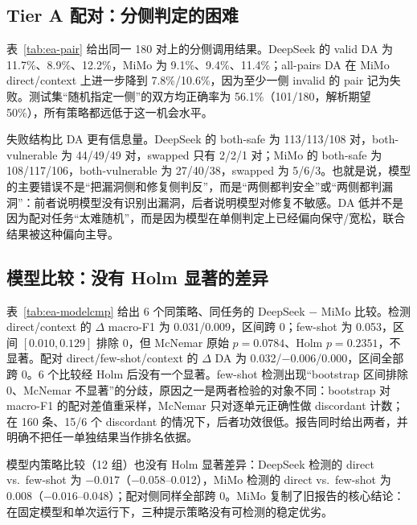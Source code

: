 \documentclass[conference]{IEEEtran}
\begin{document}
\subsection{Tier A 配对：分侧判定的困难}
表~\ref{tab:ea-pair} 给出同一 180 对上的分侧调用结果。DeepSeek 的 valid DA 为 11.7\%、8.9\%、12.2\%，MiMo 为 9.1\%、9.4\%、11.4\%；all-pairs DA 在 MiMo direct/context 上进一步降到 7.8\%/10.6\%，因为至少一侧 invalid 的 pair 记为失败。测试集“随机指定一侧”的双方均正确率为 56.1\%（101/180，解析期望 50\%），所有策略都远低于这一机会水平。

失败结构比 DA 更有信息量。DeepSeek 的 both-safe 为 113/113/108 对，both-vulnerable 为 44/49/49 对，swapped 只有 2/2/1 对；MiMo 的 both-safe 为 108/117/106，both-vulnerable 为 27/40/38，swapped 为 5/6/3。也就是说，模型的主要错误不是“把漏洞侧和修复侧判反”，而是“两侧都判安全”或“两侧都判漏洞”：前者说明模型没有识别出漏洞，后者说明模型对修复不敏感。DA 低并不是因为配对任务“太难随机”，而是因为模型在单侧判定上已经偏向保守/宽松，联合结果被这种偏向主导。

\subsection{模型比较：没有 Holm 显著的差异}
表~\ref{tab:ea-modelcmp} 给出 6 个同策略、同任务的 DeepSeek $-$ MiMo 比较。检测 direct/context 的 $\Delta$ macro-F1 为 0.031/0.009，区间跨 0；few-shot 为 0.053，区间 $[0.010,0.129]$ 排除 0，但 McNemar 原始 $p=0.0784$、Holm $p=0.2351$，不显著。配对 direct/few-shot/context 的 $\Delta$ DA 为 0.032/$-0.006$/0.000，区间全部跨 0。6 个比较经 Holm 后没有一个显著。few-shot 检测出现“bootstrap 区间排除 0、McNemar 不显著”的分歧，原因之一是两者检验的对象不同：bootstrap 对 macro-F1 的配对差值重采样，McNemar 只对逐单元正确性做 discordant 计数；在 160 条、15/6 个 discordant 的情况下，后者功效很低。报告同时给出两者，并明确不把任一单独结果当作排名依据。

模型内策略比较（12 组）也没有 Holm 显著差异：DeepSeek 检测的 direct vs.\ few-shot 为 $-0.017$（$-0.058$--0.012），MiMo 检测的 direct vs.\ few-shot 为 0.008（$-0.016$--0.048）；配对侧同样全部跨 0。MiMo 复制了旧报告的核心结论：在固定模型和单次运行下，三种提示策略没有可检测的稳定优劣。
\end{document}
